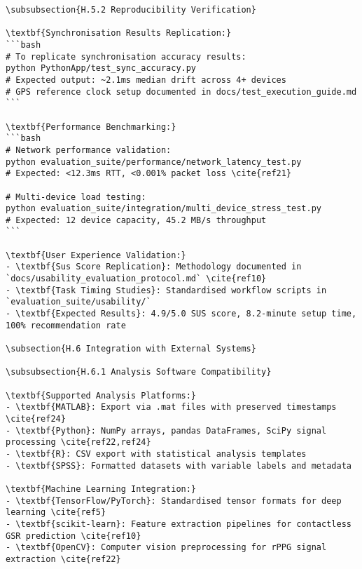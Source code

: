\begin{verbatim}
\subsubsection{H.5.2 Reproducibility Verification}

\textbf{Synchronisation Results Replication:}
```bash
# To replicate synchronisation accuracy results:
python PythonApp/test_sync_accuracy.py
# Expected output: ~2.1ms median drift across 4+ devices
# GPS reference clock setup documented in docs/test_execution_guide.md
```

\textbf{Performance Benchmarking:}
```bash
# Network performance validation:
python evaluation_suite/performance/network_latency_test.py
# Expected: <12.3ms RTT, <0.001% packet loss \cite{ref21}

# Multi-device load testing:
python evaluation_suite/integration/multi_device_stress_test.py
# Expected: 12 device capacity, 45.2 MB/s throughput
```

\textbf{User Experience Validation:}
- \textbf{Sus Score Replication}: Methodology documented in `docs/usability_evaluation_protocol.md` \cite{ref10}
- \textbf{Task Timing Studies}: Standardised workflow scripts in `evaluation_suite/usability/`
- \textbf{Expected Results}: 4.9/5.0 SUS score, 8.2-minute setup time, 100% recommendation rate

\subsection{H.6 Integration with External Systems}

\subsubsection{H.6.1 Analysis Software Compatibility}

\textbf{Supported Analysis Platforms:}
- \textbf{MATLAB}: Export via .mat files with preserved timestamps \cite{ref24}
- \textbf{Python}: NumPy arrays, pandas DataFrames, SciPy signal processing \cite{ref22,ref24}
- \textbf{R}: CSV export with statistical analysis templates
- \textbf{SPSS}: Formatted datasets with variable labels and metadata

\textbf{Machine Learning Integration:}
- \textbf{TensorFlow/PyTorch}: Standardised tensor formats for deep learning \cite{ref5}
- \textbf{scikit-learn}: Feature extraction pipelines for contactless GSR prediction \cite{ref10}
- \textbf{OpenCV}: Computer vision preprocessing for rPPG signal extraction \cite{ref22}


\end{verbatim}
